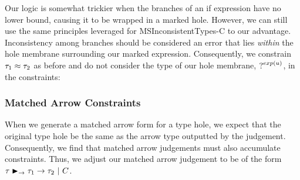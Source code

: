 \begin{mathpar}
\end{mathpar} 

Our logic is somewhat trickier when the branches of an if expression have no lower bound, causing it to be wrapped in a marked hole. However, we can still use the same principles leveraged for MSInconsistentTypes-C to our advantage. Inconsistency among branches should be considered an error that lies \emph{within} the hole membrane surrounding our marked expression. Consequently, we constrain $\TMV_1 \approx \TMV_2$ as before and do not consider the type of our hole membrane, $\TUnknown^{exp(u)}$, in the constraints:
\begin{mathpar}
\end{mathpar}

\subsubsection{Matched Arrow Constraints}
When we generate a matched arrow form for a type hole, we expect that the original type hole be the same as the arrow type outputted by the judgement. Consequently, we find that matched arrow judgements must also accumulate constraints. Thus, we adjust our matched arrow judgement to be of the form $\matchedArrow{\TMV}{\TMV_1}{\TMV_2} ~|~ C$.

